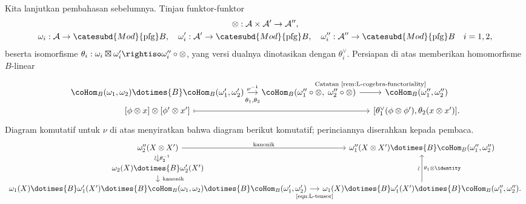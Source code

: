 Kita lanjutkan pembahasan sebelumnya. Tinjau funktor-funktor
\begin{gather*}
	\otimes: \mathcal{A} \times \mathcal{A}' \to \mathcal{A}'' , \\
	\omega_i: \mathcal{A} \to \catesubd{Mod}{\mathrm{pfg}}B, \quad \omega'_i: \mathcal{A}' \to \catesubd{Mod}{\mathrm{pfg}}B, \quad \omega''_i: \mathcal{A}'' \to \catesubd{Mod}{\mathrm{pfg}}B \quad i =1, 2,
\end{gather*}
beserta isomorfisme $\theta_i: \omega_i \boxtimes \omega'_i \rightiso \omega''_i \circ \otimes$, yang versi dualnya dinotasikan dengan $\theta_i^\vee$. Persiapan di atas memberikan homomorfisme $B$-linear
\begin{equation}\label{eqn:L-tensor}
	\begin{tikzcd}[row sep=tiny, column sep=small]
		\coHom_B(\omega_1, \omega_2) \dotimes{B} \coHom_B(\omega'_1, \omega'_2) \arrow[r, "{\nu^{-1}}", "{\theta_1, \theta_2}"' inner sep=0.6em] & \coHom_B(\omega''_1 \circ \otimes, \; \omega''_2 \circ \otimes) \arrow[r, "{\text{Catatan \ref{rem:L-cogebra-functoriality}}}" inner sep=0.6em] & \coHom_B(\omega''_1, \omega''_2) \\
		{[\phi \otimes x]} \otimes {[\phi' \otimes x']} \arrow[mapsto, rr] & & {\left[ \theta_1^\vee(\phi \otimes \phi'), \theta_2(x \otimes x') \right]} .
	\end{tikzcd}
\end{equation}
Diagram komutatif untuk $\nu$ di atas menyiratkan bahwa diagram berikut komutatif; perinciannya diserahkan kepada pembaca.
\begin{equation}\label{eqn:L-bialgebra-prod}
	\begin{tikzcd}[row sep=small, column sep=small]
		\omega''_2(X \otimes X') \arrow[d, "{\theta_2^{-1}}", "\sim"' sloped] \arrow[r, "\text{kanonik}"] & \omega''_1(X \otimes X') \dotimes{B} \coHom_B(\omega''_1, \omega''_2) \\
		\omega_2(X) \dotimes{B} \omega'_2(X') \arrow[d, "\text{kanonik}" inner sep=0.6em] &  \\
		\omega_1(X) \dotimes{B} \omega'_1(X') \dotimes{B} \coHom_B(\omega_1, \omega_2) \dotimes{B} \coHom_B(\omega'_1, \omega'_2) \arrow[r, "\text{\eqref{eqn:L-tensor}}"' inner sep=0.6em] & \omega_1(X) \dotimes{B} \omega'_1(X') \dotimes{B} \coHom_B(\omega''_1, \omega''_2). \arrow[uu, "{\theta_1 \otimes \identity}"', "\sim" sloped]
	\end{tikzcd}
\end{equation}

